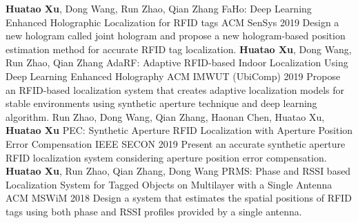 
\begin{cventries}
  \cvpub
    {\textbf{Huatao Xu}, Dong Wang, Run Zhao, Qian Zhang} %
    {FaHo: Deep Learning Enhanced Holographic Localization for RFID tags} %
    {ACM SenSys 2019} %
    { %
      Design a new hologram called joint hologram and propose a new hologram-based position estimation method for accurate RFID tag localization.
    }
    \EntryGap
  \cvpub
    {\textbf{Huatao Xu}, Dong Wang, Run Zhao, Qian Zhang} 
    {AdaRF: Adaptive RFID-based Indoor Localization Using Deep Learning Enhanced Holography} 
    {ACM IMWUT (UbiComp) 2019} 
    {
      Propose an RFID-based localization system that creates adaptive localization models for stable environments using synthetic aperture technique and deep learning algorithm.
    } 
    \EntryGap
  \cvpub
    {Run Zhao, Dong Wang, Qian Zhang, Haonan Chen, Huatao Xu, \textbf{Huatao Xu}} 
    {PEC: Synthetic Aperture RFID Localization with Aperture Position Error Compensation} 
    {IEEE SECON 2019} 
    {
      Present an accurate synthetic aperture RFID localization system considering aperture position error compensation.
    } 
    \EntryGap
  \cvpub
    {\textbf{Huatao Xu}, Run Zhao, Qian Zhang, Dong Wang} 
    {PRMS: Phase and RSSI based Localization System for Tagged Objects on Multilayer with a Single Antenna} 
    {ACM MSWiM 2018} 
    {
      Design a system that estimates the spatial positions of RFID tags using both phase and RSSI profiles provided by a single antenna.
    } 
\end{cventries}
